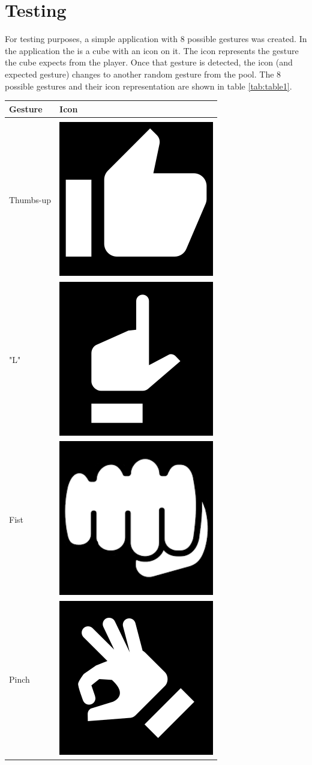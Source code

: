 \documentclass{sigchi}
\begin{document}
\section{Testing}

For testing purposes, a simple application with 8 possible gestures was created. In the application the is a cube with an icon on it. The icon represents the gesture the cube expects from the player. Once that gesture is detected, the icon (and expected gesture) changes to another random gesture from the pool. The 8 possible gestures and their icon representation are shown in table \ref{tab:table1}.

\begin{table}[h]
  \centering
  \begin{tabular}{ m{5em} m{5em} }
    Gesture & Icon \\
    \hline
    \\
    Thumbs-up & \includegraphics[width=0.2\columnwidth]{figures/thumbs-up.png} \\
    "L" & \includegraphics[width=0.2\columnwidth]{figures/thumb-index-extended.png} \\
    Fist & \includegraphics[width=0.2\columnwidth]{figures/fist.png} \\
    Pinch & \includegraphics[width=0.2\columnwidth]{figures/pinch.png} \\ 

\end{tabular}
\end{table}
\end{document}
